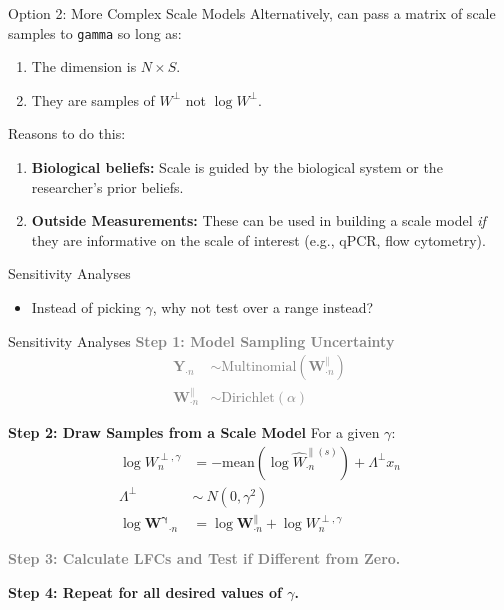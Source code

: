 \documentclass[
  ignorenonframetext,
]{beamer}
\providecommand{\tightlist}{%
  \setlength{\itemsep}{0pt}\setlength{\parskip}{0pt}}
\begin{document}
\begin{frame}[fragile]{Option 2: More Complex Scale Models}
\protect\hypertarget{option-2-more-complex-scale-models}{}
Alternatively, can pass a matrix of scale samples to \texttt{gamma} so
long as:

\begin{enumerate}
\tightlist
\item
  The dimension is \(N \times S\).
\item
  They are samples of \(W^\perp\) not \(\log W^\perp\).
\end{enumerate}

\pause

Reasons to do this:

\begin{enumerate}
\item
  \textbf{Biological beliefs:} Scale is guided by the biological system
  or the researcher's prior beliefs.
\item
  \textbf{Outside Measurements:} These can be used in building a scale
  model \emph{if} they are informative on the scale of interest (e.g.,
  qPCR, flow cytometry).
\end{enumerate}
\end{frame}

\begin{frame}{Sensitivity Analyses}
\protect\hypertarget{sensitivity-analyses}{}
\begin{itemize}
\tightlist
\item
  Instead of picking \(\gamma\), why not test over a range instead?
\end{itemize}
\end{frame}

\begin{frame}{Sensitivity Analyses}
\protect\hypertarget{sensitivity-analyses-1}{}
\textcolor{gray}{\textbf{Step 1: Model Sampling Uncertainty}}
\textcolor{gray}{\begin{align*}
\mathbf{Y}_{\cdot n} &\sim \text{Multinomial}(\mathbf{W}_{\cdot n}^\parallel)\\
\mathbf{W}_{\cdot n}^\parallel &\sim \text{Dirichlet}(\alpha)
\end{align*}}

\textbf{Step 2: Draw Samples from a Scale Model} For a given \(\gamma\):
\begin{align*}
\log W_{n}^{\perp, \gamma} &= - \mathrm{mean} \left(\log \hat{W}^{\parallel (s)}_{\cdot n}\right) + \Lambda^\perp x_{n}\\
\Lambda^\perp  &\sim \ N(0, \gamma^2)\\
\log \mathbf{W^\gamma}_{\cdot n} &= \log \mathbf{W}_{\cdot n}^\parallel + \log W_{n}^{\perp, \gamma}
\end{align*}

\textcolor{gray}{\textbf{Step 3: Calculate LFCs and Test if Different from Zero.}}

\textbf{Step 4: Repeat for all desired values of $\gamma$.}
\end{frame}
\end{document}
